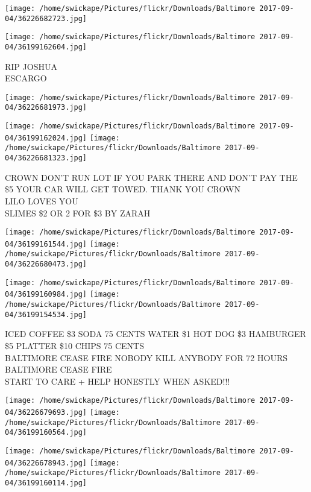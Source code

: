\documentclass[10pt,letterpaper]{article}
\begin{document}
\texttt{[image: /home/swickape/Pictures/flickr/Downloads/Baltimore 2017-09-04/36226682723.jpg]}

\vspace{0.25in}
\texttt{[image: /home/swickape/Pictures/flickr/Downloads/Baltimore 2017-09-04/36199162604.jpg]}

RIP JOSHUA\\
ESCARGO\\
\pagebreak

\texttt{[image: /home/swickape/Pictures/flickr/Downloads/Baltimore 2017-09-04/36226681973.jpg]}

\vspace{0.25in}
\texttt{[image: /home/swickape/Pictures/flickr/Downloads/Baltimore 2017-09-04/36199162024.jpg]}
\texttt{[image: /home/swickape/Pictures/flickr/Downloads/Baltimore 2017-09-04/36226681323.jpg]}

CROWN DON'T RUN LOT IF YOU PARK THERE AND DON'T PAY THE \$5 YOUR CAR WILL GET TOWED.  THANK YOU CROWN\\
LILO LOVES YOU\\
SLIMES \$2 OR 2 FOR \$3 BY ZARAH\\
\pagebreak

\texttt{[image: /home/swickape/Pictures/flickr/Downloads/Baltimore 2017-09-04/36199161544.jpg]}
\texttt{[image: /home/swickape/Pictures/flickr/Downloads/Baltimore 2017-09-04/36226680473.jpg]}

\texttt{[image: /home/swickape/Pictures/flickr/Downloads/Baltimore 2017-09-04/36199160984.jpg]}
\texttt{[image: /home/swickape/Pictures/flickr/Downloads/Baltimore 2017-09-04/36199154534.jpg]}

ICED COFFEE \$3 SODA 75 CENTS WATER \$1 HOT DOG \$3 HAMBURGER \$5 PLATTER \$10 CHIPS 75 CENTS\\
BALTIMORE CEASE FIRE NOBODY KILL ANYBODY FOR 72 HOURS\\
BALTIMORE CEASE FIRE\\
START TO CARE + HELP HONESTLY WHEN ASKED!!!\\
\pagebreak

\texttt{[image: /home/swickape/Pictures/flickr/Downloads/Baltimore 2017-09-04/36226679693.jpg]}
\texttt{[image: /home/swickape/Pictures/flickr/Downloads/Baltimore 2017-09-04/36199160564.jpg]}

\texttt{[image: /home/swickape/Pictures/flickr/Downloads/Baltimore 2017-09-04/36226678943.jpg]}
\texttt{[image: /home/swickape/Pictures/flickr/Downloads/Baltimore 2017-09-04/36199160114.jpg]}
\end{document}
